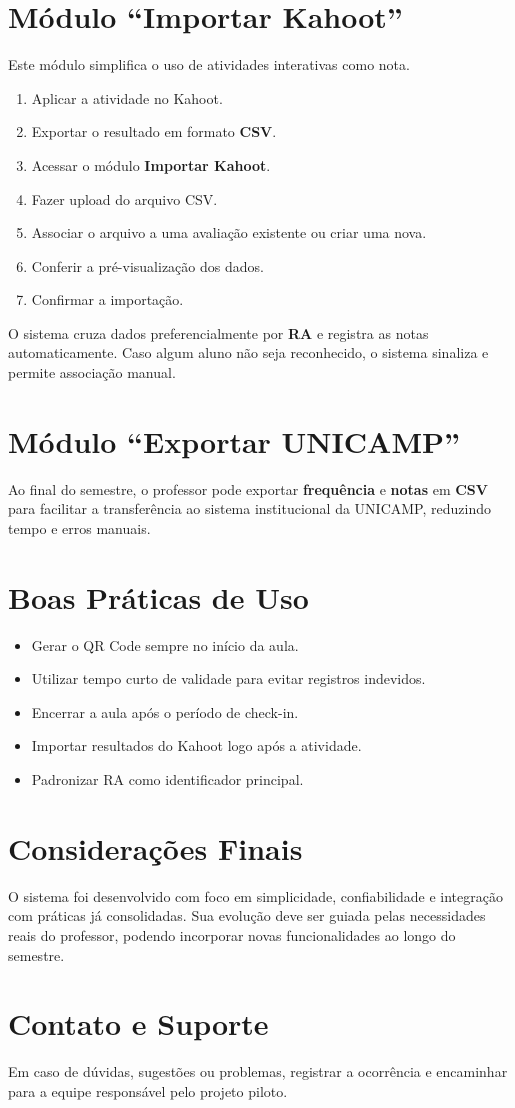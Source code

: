 \documentclass[12pt,a4paper]{article}
\begin{document}
\section{Módulo ``Importar Kahoot''}
Este módulo simplifica o uso de atividades interativas como nota.
\begin{enumerate}[label=\arabic*)]
  \item Aplicar a atividade no Kahoot.
  \item Exportar o resultado em formato \textbf{CSV}.
  \item Acessar o módulo \textbf{Importar Kahoot}.
  \item Fazer upload do arquivo CSV.
  \item Associar o arquivo a uma avaliação existente ou criar uma nova.
  \item Conferir a pré-visualização dos dados.
  \item Confirmar a importação.
\end{enumerate}
O sistema cruza dados preferencialmente por \textbf{RA} e registra as notas automaticamente. Caso algum aluno não seja reconhecido, o sistema sinaliza e permite associação manual.

\section{Módulo ``Exportar UNICAMP''}
Ao final do semestre, o professor pode exportar \textbf{frequência} e \textbf{notas} em \textbf{CSV} para facilitar a transferência ao sistema institucional da UNICAMP, reduzindo tempo e erros manuais.

\section{Boas Práticas de Uso}
\begin{itemize}[noitemsep]
  \item Gerar o QR Code sempre no início da aula.
  \item Utilizar tempo curto de validade para evitar registros indevidos.
  \item Encerrar a aula após o período de check-in.
  \item Importar resultados do Kahoot logo após a atividade.
  \item Padronizar RA como identificador principal.
\end{itemize}

\section{Considerações Finais}
O sistema foi desenvolvido com foco em simplicidade, confiabilidade e integração com práticas já consolidadas. Sua evolução deve ser guiada pelas necessidades reais do professor, podendo incorporar novas funcionalidades ao longo do semestre.

\section*{Contato e Suporte}
Em caso de dúvidas, sugestões ou problemas, registrar a ocorrência e encaminhar para a equipe responsável pelo projeto piloto.
\end{document}
